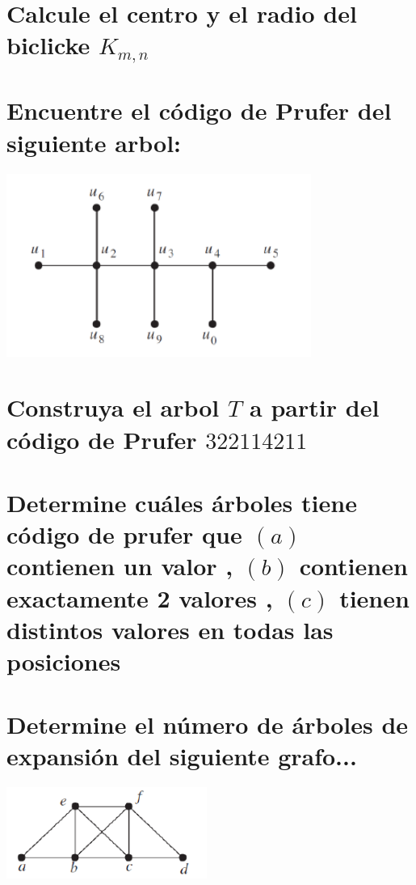 \documentclass[10pt,a4paper]{article} %
\begin{document}

    \section{Calcule el centro y el radio del biclicke $K_{m,n}$}




    \section{Encuentre el código de Prufer del siguiente arbol:}
        \begin{center}
            \includegraphics[width=0.4\linewidth]{arbolp4}
        \end{center}




    \section{Construya el arbol $T$ a partir del código de Prufer $322114211$}





    \section{Determine cuáles árboles tiene código de prufer que $(a)$
    contienen un valor , $(b)$ contienen exactamente 2 valores , $(c)$ tienen
    distintos valores en todas las posiciones}




    \section{Determine el número de árboles de expansión del siguiente grafo...}
       \begin{center}
            \includegraphics[width=0.5\linewidth]{grafop7.png}
       \end{center}
\end{document}
